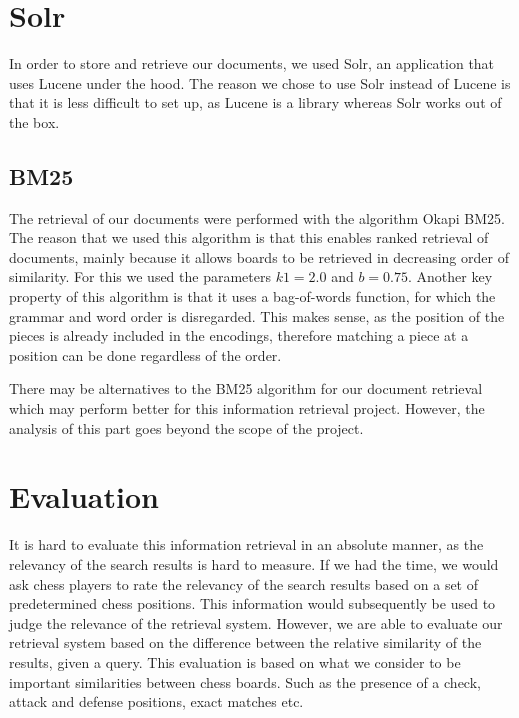 \documentclass[11pt]{article}
\begin{document}
    \section{Solr}

    In order to store and retrieve our documents, we used Solr, an application that uses Lucene under the hood. The reason we chose to use Solr instead of Lucene is that it is less difficult to set up, as Lucene is a library whereas Solr works out of the box.

    \subsection{BM25}

    The retrieval of our documents were performed with the algorithm Okapi BM25. The reason that we used this algorithm is that this enables ranked retrieval of documents, mainly because it allows boards to be retrieved in decreasing order of similarity. For this we used the parameters $k1 = 2.0$ and $b = 0.75$. Another key property of this algorithm is that it uses a bag-of-words function, for which the grammar and word order is disregarded. This makes sense, as the position of the pieces is already included in the encodings, therefore matching a piece at a position can be done regardless of the order.


    There may be alternatives to the BM25 algorithm for our document retrieval which may perform better for this information retrieval project. However, the analysis of this part goes beyond the scope of the project.




    \section{Evaluation}

    It is hard to evaluate this information retrieval in an absolute manner, as the relevancy of the search results is hard to measure. If we had the time, we would ask chess players to rate the relevancy of the search results based on a set of predetermined chess positions. This information would subsequently be used to judge the relevance of the retrieval system. However, we are able to evaluate our retrieval system based on the difference between the relative similarity of the results, given a query. This evaluation is based on what we consider to be important similarities between chess boards. Such as the presence of a check, attack and defense positions, exact matches etc.
\end{document}
